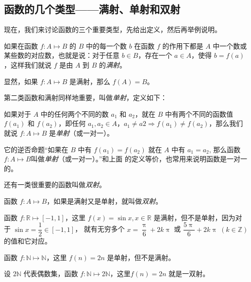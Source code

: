 \subsection{函数的几个类型——满射、单射和双射}
现在，我们来讨论函数的三个重要类型，先给出定义，然后再举例说明。

\begin{Definition}
  如果在函数 $f:A\mapsto B$ 的 $B$ 中的每一个数 $b$ 在函数 $f$ 的作用下都是 $A$ 中一个数或某些数的对应数，也就是说：对于任意 $b\in B$，存在一个 $a\in A$，使得 $b=f(a)$，这样我们就说 $f$ 是由 $A$ 到 $B$ 的\emph{满射}。
\end{Definition}

显然，如果 $f:A\mapsto B$ 是满射，那么 $f(A)=B$。

第二类函数和满射同样地重要，叫做\emph{单射}，定义如下：

\begin{Definition}
  如果对于 $A$ 中的任何两个不同的数 $a_1$ 和 $a_2$，就在 $B$ 中有两个不同的函数值 $f(a_1)$ 和 $f(a_2)$，即任何 $a_1,a_2\in A$，$a_1\ne a2\Rightarrow f(a_1)\ne f(a_2)$，那么我们就说 $f:A\mapsto B$ 是\emph{单射}（或一对一）。
\end{Definition}

 
它的逆否命题“如果在 $B$ 中有 $f(a_1)=f(a_2)$ 就在 $A$ 中有
$a_1=a_2$, 那么函数 $f:A\mapsto B$叫做\emph{单射}（或一对一）。”和上面
的定义等价，也常用来说明函数是一对一的。

还有一类很重要的函数叫做\emph{双射}。

\begin{Definition}
  函数 $f:A\mapsto B$，如果是满射又是单射，就叫做\emph{双射}。
\end{Definition}

\begin{example}
  函数 $f:\mathbb{R}\mapsto [-1,1]$，这里 $f(x)=\sin x, x\in\mathbb{R}$
是满射，但不是单射，因为对于 $\sin x=\dfrac{1}{2}\in [-1,1]$，
就有无穷多个 $x=\dfrac{\uppi}{6}+2k\uppi$ 或 $\dfrac{5\uppi}{6}+2k\uppi\;(k\in\mathbb{Z})$ 的值和它对应。
\end{example}

\begin{example}
  函数 $f:\mathbb{N}\mapsto\mathbb{N}$，这里 $f(n)=2n$ 是单射，但不是满射。
\end{example}

\begin{example}
  设 $2\mathbb{N}$ 代表偶数集，函数 $f:\mathbb{N}\mapsto 2\mathbb{N}$，这里$f(n)=2n$ 就是一双射。
\end{example}

